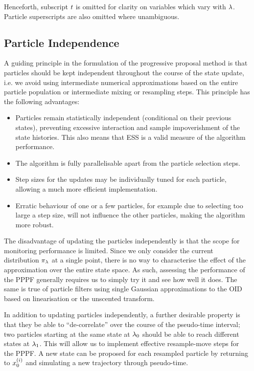 \documentclass{article}
\begin{document}
Henceforth, subscript $t$ is omitted for clarity on variables which vary with $\lambda$. Particle superscripts are also omitted where unambiguous.



\subsection{Particle Independence} \label{sec:particle_independence}

A guiding principle in the formulation of the progressive proposal method is that particles should be kept independent throughout the course of the state update, i.e. we avoid using intermediate numerical approximations based on the entire particle population or intermediate mixing or resampling steps. This principle has the following advantages:
%
\begin{itemize}
  \item Particles remain statistically independent (conditional on their previous states), preventing excessive interaction and sample impoverishment of the state histories. This also means that ESS is a valid measure of the algorithm performance.
  \item The algorithm is fully parallelisable apart from the particle selection steps.
  \item Step sizes for the updates may be individually tuned for each particle, allowing a much more efficient implementation.
  \item Erratic behaviour of one or a few particles, for example due to selecting too large a step size, will not influence the other particles, making the algorithm more robust.
\end{itemize}

The disadvantage of updating the particles independently is that the scope for monitoring performance is limited. Since we only consider the current distribution $\pi_{\lambda}$ at a single point, there is no way to characterise the effect of the approximation over the entire state space. As such, assessing the performance of the PPPF generally requires us to simply try it and see how well it does. The same is true of particle filters using single Gaussian approximations to the OID based on linearisation or the unscented transform.

In addition to updating particles independently, a further desirable property is that they be able to ``de-correlate'' over the course of the pseudo-time interval; two particles starting at the same state at $\lambda_0$ should be able to reach different states at $\lambda_1$. This will allow us to implement effective resample-move steps for the PPPF. A new state can be proposed for each resampled particle by returning to $x_{0}^{(i)}$ and simulating a new trajectory through pseudo-time.
\end{document}
